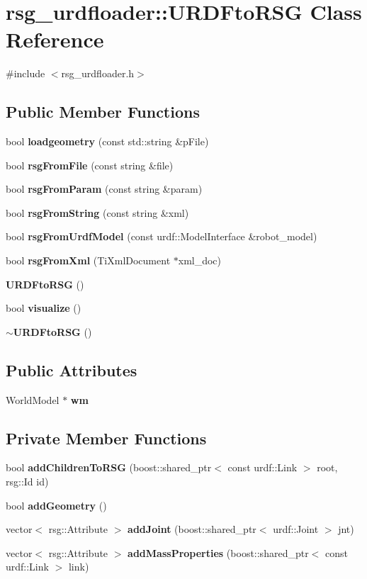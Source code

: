\section{rsg\-\_\-urdfloader\-:\-:\-U\-R\-D\-Fto\-R\-S\-G \-Class \-Reference}
\label{classrsg__urdfloader_1_1URDFtoRSG}


{\ttfamily \#include $<$rsg\-\_\-urdfloader.\-h$>$}

\subsection*{\-Public \-Member \-Functions}
\begin{DoxyCompactItemize}
\item 
bool {\bf loadgeometry} (const std\-::string \&p\-File)
\item 
bool {\bf rsg\-From\-File} (const string \&file)
\item 
bool {\bf rsg\-From\-Param} (const string \&param)
\item 
bool {\bf rsg\-From\-String} (const string \&xml)
\item 
bool {\bf rsg\-From\-Urdf\-Model} (const urdf\-::\-Model\-Interface \&robot\-\_\-model)
\item 
bool {\bf rsg\-From\-Xml} (\-Ti\-Xml\-Document $\ast$xml\-\_\-doc)
\item 
{\bf \-U\-R\-D\-Fto\-R\-S\-G} ()
\item 
bool {\bf visualize} ()
\item 
{\bf $\sim$\-U\-R\-D\-Fto\-R\-S\-G} ()
\end{DoxyCompactItemize}
\subsection*{\-Public \-Attributes}
\begin{DoxyCompactItemize}
\item 
\-World\-Model $\ast$ {\bf wm}
\end{DoxyCompactItemize}
\subsection*{\-Private \-Member \-Functions}
\begin{DoxyCompactItemize}
\item 
bool {\bf add\-Children\-To\-R\-S\-G} (boost\-::shared\-\_\-ptr$<$ const urdf\-::\-Link $>$ root, rsg\-::\-Id id)
\item 
bool {\bf add\-Geometry} ()
\item 
vector$<$ rsg\-::\-Attribute $>$ {\bf add\-Joint} (boost\-::shared\-\_\-ptr$<$ urdf\-::\-Joint $>$ jnt)
\item 
vector$<$ rsg\-::\-Attribute $>$ {\bf add\-Mass\-Properties} (boost\-::shared\-\_\-ptr$<$ const urdf\-::\-Link $>$ link)
\end{DoxyCompactItemize}


